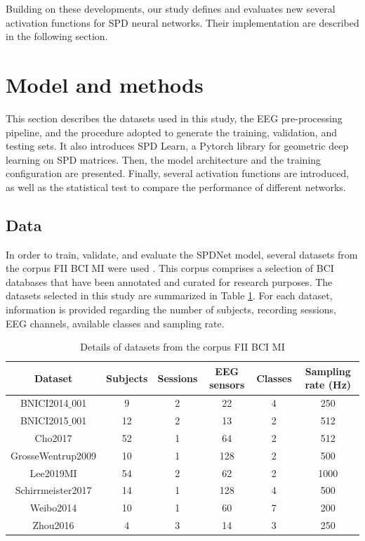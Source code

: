 \documentclass[11pt,a4paper]{article}
\begin{document}
\noindent Building on these developments, our study defines and evaluates new several activation functions for SPD neural networks. Their implementation are described in the following section. 






\newpage
\section{Model and methods}
This section describes the datasets used in this study, the EEG pre-processing pipeline, and the procedure adopted to generate the training, validation, and testing sets. It also introduces SPD Learn, a Pytorch library for geometric deep learning on SPD matrices. Then, the model architecture and the training configuration are presented. Finally, several activation functions are introduced, as well as the statistical test to compare the performance of different networks. 

\subsection{Data}
In order to train, validate, and evaluate the SPDNet model, several datasets from the corpus FII BCI MI were used \cite{corpus}.
This corpus comprises a selection of BCI databases that have been annotated and curated for research purposes. The datasets selected in this study are summarized in Table \ref{tab:datasets}. For each dataset, information is provided regarding the number of subjects, recording sessions, EEG channels, available classes and sampling rate. 

\begin{table}[H]
\centering
\caption{Details of datasets from the corpus FII BCI MI}
\label{tab:datasets}
\begin{tabular}{|c|c|c|c|c|c|}

\hline
Dataset & Subjects & Sessions & EEG sensors & Classes & Sampling rate (Hz)\\
\hline
BNICI2014$\_$001 & 9 & 2 & 22 &  4 & 250 \\ 
\hline
BNICI2015$\_$001 & 12 & 2 & 13 & 2 & 512 \\ 
\hline
Cho2017 & 52 & 1 & 64 &  2 & 512 \\ 
\hline
GrosseWentrup2009 & 10 & 1 & 128 & 2 & 500 \\
\hline 
Lee2019MI & 54 & 2 & 62 &  2 & 1000 \\ 
\hline
Schirrmeister2017 & 14 & 1 & 128 &  4 & 500 \\ 
\hline
Weibo2014 & 10 & 1 & 60 & 7 & 200 \\ 
\hline
Zhou2016 & 4 & 3 & 14 & 3 & 250 \\  
\hline

\end{tabular}
\end{table}
\end{document}
